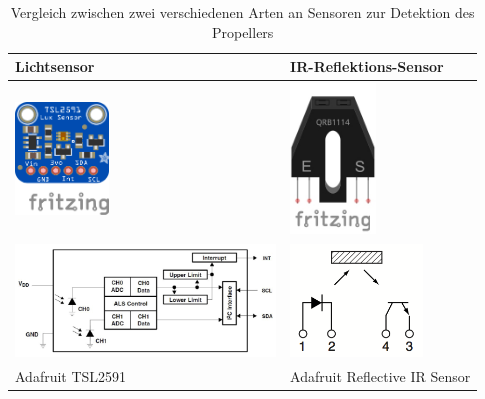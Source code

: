 \begin{table}[h]
	\centering
	\begin{tabularx}{0.95\textwidth}{M|M}

		Lichtsensor & IR-Reflektions-Sensor \\
		\hline
		\includegraphics[height=3cm]{images/chapter/03/sensor_tsl2591.jpg} & \includegraphics[height=4cm]{images/chapter/03/sensor_ir.jpg}  \\
		\includegraphics[height=3cm]{images/chapter/03/sensor_tsl2591_schema.png} & \includegraphics[height=3cm]{images/chapter/03/sensor_ir_schema.png} \\
		Adafruit TSL2591 & Adafruit Reflective IR Sensor \newline \\
	\end{tabularx}
	\caption{Vergleich zwischen zwei verschiedenen Arten an Sensoren zur Detektion des Propellers}
\end{table}

